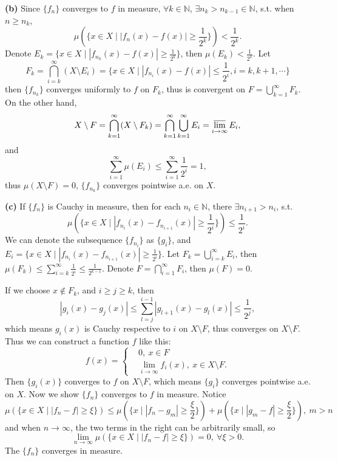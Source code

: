 \documentclass{article}%
\begin{document}
\begin{enumerate}
\textbf{(b)}
Since $\{f_n\}$ converges to $f$ in measure, $\forall k \in \mathbb{N}$, $\exists n_k > n_{k-1} \in \mathbb{N}$, s.t. when $n \ge n_k$,
$$
\mu(\{x\in X\mid |f_n(x)-f(x)| \ge \frac{1}{2^k}\}) < \frac{1}{2^k}.
$$
Denote $E_{k} = \{x\in X\mid |f_{n_k}(x)-f(x)| \ge \frac{1}{2^k}\}$, then $\mu(E_k) < \frac{1}{2^k}$. Let 
$$
F_k = \bigcap_{i=k}^{\infty} (X\setminus 
E_i) = \{x\in X\mid |f_{n_i}(x)-f(x)|\le \frac{1}{2^i}, i = k, k+1, \cdots\}
$$
then $\{f_{n_k}\}$ converges uniformly to $f$ on $F_k$, thus is convergent on $F = \bigcup\limits_{k=1}^{\infty}F_k$. On the other hand,
$$
X\setminus F = \bigcap_{k=1}^{\infty}(X\setminus F_k) = \bigcap_{k=1}^{\infty}\bigcup_{k=1}^{\infty}E_i = \varlimsup_{i\to\infty}E_i,
$$
and 
$$
\sum_{i=1}^{\infty}\mu(E_i) \le \sum_{i=1}^{\infty}\frac{1}{2^i} = 1, 
$$
thus $\mu(X\setminus F) = 0$, $\{f_{n_k}\}$ converges pointwise a.e. on $X$.

\textbf{(c)} If $\{f_n\}$ is Cauchy in measure, then for each $n_i \in \mathbb{N}$, there $\exists n_{i+1} > n_{i}$, s.t. 
$$
\mu(\{x\in X\mid |f_{n_i}(x)-f_{n_{i+1}}(x)| \ge \frac{1}{2^i}\})\le \frac{1}{2^i}.
$$
We can denote the subsequence $\{f_{n_i}\}$ as $\{g_i\}$, and $E_i = \{x\in X\mid |f_{n_i}(x)-f_{n_{i+1}}(x)| \ge \frac{1}{2^i}\}$. Let $F_{k} = \bigcup\limits_{i = k}^{\infty}E_i $, then $\mu(F_k)\le \sum\limits_{i=k}^{\infty}\frac{1}{2^i}\le \frac{1}{2^{k-1}} $. Denote $F = \bigcap\limits_{i=1}^\infty F_i $, then $\mu(F) = 0$.

If we choose $x\notin F_{k}$, and $i \ge j \ge k$, then 
$$
|g_i(x)-g_j(x)| \le \sum_{l = j}^{i-1}|g_{l+1}(x)-g_l(x)| \le \frac{1}{2^j},
$$
which means $g_i(x)$ is Cauchy respective to $i$ on $X\setminus F$, thus converges on $X\setminus F$. Thus we can construct a function $f$ like this: 
$$
f(x) = \left\{
\begin{aligned}
&0, ~x\in F \\
&\lim_{i\to\infty}f_i(x), ~x\in X\setminus F.
\end{aligned}
\right.
$$
Then $\{g_i(x)\}$ converges to $f$ on $X\setminus F$, which means $\{g_i\}$ converges pointwise a.e. on $X$. Now we show $\{f_n\}$ converges to $f$ in measure. Notice
$$
\mu(\{x\in X\mid |f_n - f|\ge \xi\}) \le \mu(\{x\mid |f_n-g_m|\ge \frac{\xi}{2}\}) + \mu(\{x\mid |g_m-f|\ge \frac{\xi}{2}\}), ~m > n
$$
and when $n\to\infty$, the two terms in the right can be arbitrarily small, so 
$$
\lim_{n\to\infty}\mu(\{x\in X\mid |f_n - f|\ge \xi\}) = 0, ~\forall \xi > 0.
$$
The $\{f_{n}\}$ converges in measure.
\bigskip



\end{enumerate}
\end{document}
